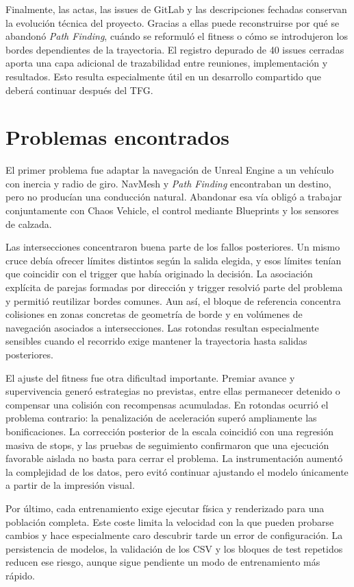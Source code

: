 Finalmente, las actas, las issues de GitLab y las descripciones fechadas conservan la evolución técnica del proyecto. Gracias a ellas puede reconstruirse por qué se abandonó \textit{Path Finding}, cuándo se reformuló el fitness o cómo se introdujeron los bordes dependientes de la trayectoria. El registro depurado de 40 issues cerradas aporta una capa adicional de trazabilidad entre reuniones, implementación y resultados. Esto resulta especialmente útil en un desarrollo compartido que deberá continuar después del TFG\@.

\section{Problemas encontrados}

El primer problema fue adaptar la navegación de Unreal Engine a un vehículo con inercia y radio de giro. NavMesh y \textit{Path Finding} encontraban un destino, pero no producían una conducción natural. Abandonar esa vía obligó a trabajar conjuntamente con Chaos Vehicle, el control mediante Blueprints y los sensores de calzada.

Las intersecciones concentraron buena parte de los fallos posteriores. Un mismo cruce debía ofrecer límites distintos según la salida elegida, y esos límites tenían que coincidir con el trigger que había originado la decisión. La asociación explícita de parejas formadas por dirección y trigger resolvió parte del problema y permitió reutilizar bordes comunes. Aun así, el bloque de referencia concentra colisiones en zonas concretas de geometría de borde y en volúmenes de navegación asociados a intersecciones. Las rotondas resultan especialmente sensibles cuando el recorrido exige mantener la trayectoria hasta salidas posteriores.

El ajuste del fitness fue otra dificultad importante. Premiar avance y supervivencia generó estrategias no previstas, entre ellas permanecer detenido o compensar una colisión con recompensas acumuladas. En rotondas ocurrió el problema contrario: la penalización de aceleración superó ampliamente las bonificaciones. La corrección posterior de la escala coincidió con una regresión masiva de stops, y las pruebas de seguimiento confirmaron que una ejecución favorable aislada no basta para cerrar el problema. La instrumentación aumentó la complejidad de los datos, pero evitó continuar ajustando el modelo únicamente a partir de la impresión visual.

Por último, cada entrenamiento exige ejecutar física y renderizado para una población completa. Este coste limita la velocidad con la que pueden probarse cambios y hace especialmente caro descubrir tarde un error de configuración. La persistencia de modelos, la validación de los CSV y los bloques de test repetidos reducen ese riesgo, aunque sigue pendiente un modo de entrenamiento más rápido.

